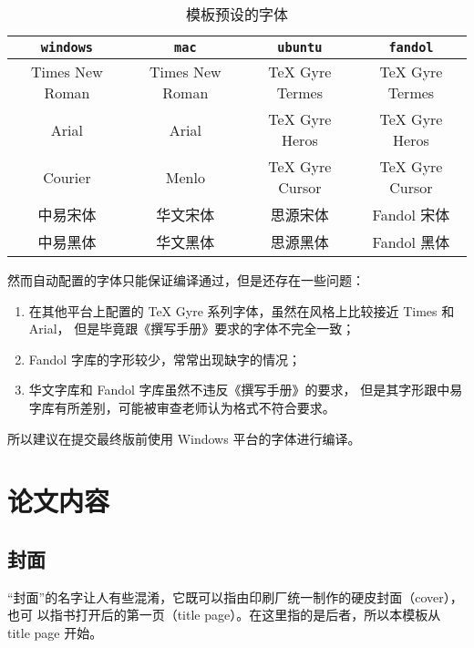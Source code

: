 \documentclass[a4paper]{ltxdoc}
\DeclareRobustCommand\opt{\texttt}
\begin{document}
\begin{table}[htb]
  \centering
  \caption{模板预设的字体}
  \label{tab:fontset}
  \begin{tabular}{cccc}
    \toprule
    \opt{windows} & \opt{mac}    & \opt{ubuntu} & \opt{fandol} \\
    \midrule
    Times New Roman  & Times New Roman & TeX Gyre Termes & TeX Gyre Termes \\
    Arial            & Arial           & TeX Gyre Heros  & TeX Gyre Heros  \\
    Courier          & Menlo           & TeX Gyre Cursor & TeX Gyre Cursor \\
    中易宋体         & 华文宋体        & 思源宋体        & Fandol 宋体     \\
    中易黑体         & 华文黑体        & 思源黑体        & Fandol 黑体     \\
    \bottomrule
  \end{tabular}
\end{table}

然而自动配置的字体只能保证编译通过，但是还存在一些问题：
\begin{enumerate}
  \item 在其他平台上配置的 TeX Gyre 系列字体，虽然在风格上比较接近 Times 和 Arial，
    但是毕竟跟《撰写手册》要求的字体不完全一致；
  \item Fandol 字库的字形较少，常常出现缺字的情况；
  \item 华文字库和 Fandol 字库虽然不违反《撰写手册》的要求，
    但是其字形跟中易字库有所差别，可能被审查老师认为格式不符合要求。
\end{enumerate}

所以建议在提交最终版前使用 Windows 平台的字体进行编译。



\section{论文内容}

\subsection{封面}

“封面”的名字让人有些混淆，它既可以指由印刷厂统一制作的硬皮封面（cover），也可
以指书打开后的第一页（title page）。在这里指的是后者，所以本模板从 title page
开始。
\end{document}
